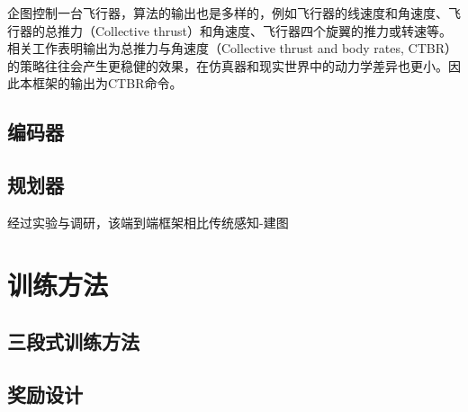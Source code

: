 企图控制一台飞行器，算法的输出也是多样的，例如飞行器的线速度和角速度、飞行器的总推力（Collective thrust）和角速度、飞行器四个旋翼的推力或转速等。相关工作表明\cite{kaufmann2022benchmark}输出为总推力与角速度（Collective thrust and body rates, CTBR）的策略往往会产生更稳健的效果，在仿真器和现实世界中的动力学差异也更小。因此本框架的输出为CTBR命令。

\subsection{编码器}

\subsection{规划器}


经过实验与调研，该端到端框架相比传统感知-建图

\section{训练方法}
\subsection{三段式训练方法}
\subsection{奖励设计}


